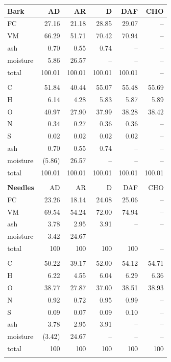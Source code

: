 \begin{longtable}{lrrrrr}
    \textbf{Bark} & AD & AR & D & DAF & CHO \\
    \midrule
    FC       & 27.16  & 21.18  & 28.85  & 29.07  & -- \\
    VM       & 66.29  & 51.71  & 70.42  & 70.94  & -- \\
    ash      & 0.70   & 0.55   & 0.74   & --     & -- \\
    moisture & 5.86   & 26.57  & --     & --     & -- \\
    total    & 100.01 & 100.01 & 100.01 & 100.01 & -- \\
    \\
    C        & 51.84  & 40.44  & 55.07  & 55.48  & 55.69 \\
    H        & 6.14   & 4.28   & 5.83   & 5.87   & 5.89 \\
    O        & 40.97  & 27.90  & 37.99  & 38.28  & 38.42 \\
    N        & 0.34   & 0.27   & 0.36   & 0.36   & -- \\
    S        & 0.02   & 0.02   & 0.02   & 0.02   & -- \\
    ash      & 0.70   & 0.55   & 0.74   & --     & -- \\
    moisture & (5.86) & 26.57  & --     & --     & -- \\
    total    & 100.01 & 100.01 & 100.01 & 100.01 & 100.01 \\
    \\

    \textbf{Needles} & AD & AR & D & DAF & CHO \\
    \midrule
    FC       & 23.26  & 18.14  & 24.08  & 25.06  & -- \\
    VM       & 69.54  & 54.24  & 72.00  & 74.94  & -- \\
    ash      & 3.78   & 2.95   & 3.91   & --     & -- \\
    moisture & 3.42   & 24.67  & --     & --     & -- \\
    total    & 100    & 100    & 100    & 100    & -- \\
    \\
    C        & 50.22  & 39.17  & 52.00  & 54.12  & 54.71 \\
    H        & 6.22   & 4.55   & 6.04   & 6.29   & 6.36 \\
    O        & 38.77  & 27.87  & 37.00  & 38.51  & 38.93 \\
    N        & 0.92   & 0.72   & 0.95   & 0.99   & -- \\
    S        & 0.09   & 0.07   & 0.09   & 0.10   & -- \\
    ash      & 3.78   & 2.95   & 3.91   & --     & -- \\
    moisture & (3.42) & 24.67  & --     & --     & -- \\
    total    & 100    & 100    & 100    & 100    & 100 \\
    \\


\end{longtable}
